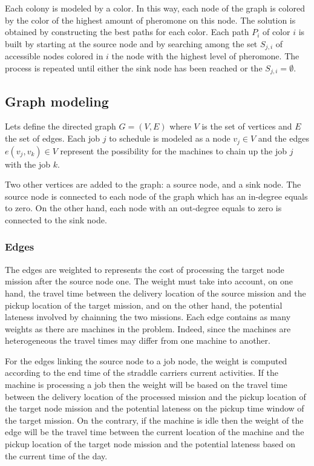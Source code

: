 \documentclass[a4paper,10pt]{article}
\begin{document}
Each colony is modeled by a color. In this way, each node of the graph is colored by the color of the highest amount of pheromone on this node. The solution is obtained by constructing the best paths for each color. Each path $P_i$ of color $i$ is built by starting at the source node and by searching among the set $S_{j,i}$ of accessible nodes colored in $i$ the node with the highest level of pheromone. The process is repeated until either the sink node has been reached or the $S_{j,i} = \emptyset$.

\subsection{Graph modeling}
Lets define the directed graph $G = (V,E)$ where $V$ is the set of vertices and $E$ the set of edges. Each job $j$ to schedule is modeled as a node $v_j \in V$ and the edges $e(v_j,v_k) \in V$ represent the possibility for the machines to chain up the job $j$ with the job $k$.

Two other vertices are added to the graph: a source node, and a sink node. The source node is connected to each node of the graph which has an in-degree equals to zero. On the other hand, each node with an out-degree equals to zero is connected to the sink node. %


\subsubsection{Edges}
The edges are weighted to represents the cost of processing the target node mission after the source node one. The weight must take into account, on one hand, the travel time between the delivery location of the source mission and the pickup location of the target mission, and on the other hand, the potential lateness involved by chainning the two missions. Each edge contains as many weights as there are machines in the problem. Indeed, since the machines are heterogeneous the travel times may differ from one machine to another.

For the edges linking the source node to a job node, the weight is computed according to the end time of the straddle carriers current activities. If the machine is processing a job then the weight will be based on the travel time between the delivery location of the processed mission and the pickup location of the target node mission and the potential lateness on the pickup time window of the target mission. On the contrary, if the machine is idle then the weight of the edge will be the travel time between the current location of the machine and the pickup location of the target node mission and the potential lateness based on the current time of the day.
\end{document}

